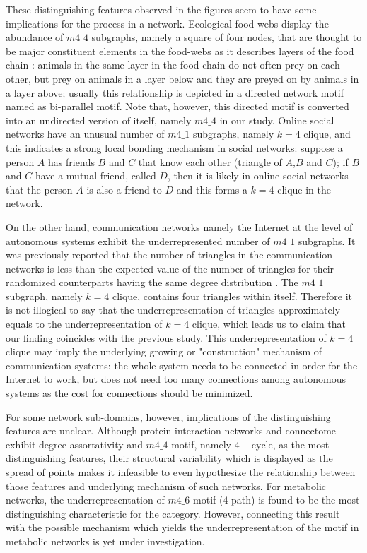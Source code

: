 These distinguishing features observed in the figures seem to have some implications for the process in a network. Ecological food-webs display the abundance of $m4\_4$ subgraphs, namely a square of four nodes, that are thought to be major constituent elements in the food-webs as it describes layers of the food chain \cite{Milo_motif,BiParallel}: animals in the same layer in the food chain do not often prey on each other, but prey on animals in a layer below and they are preyed on by animals in a layer above; usually this relationship is depicted in a directed network motif named as bi-parallel motif. Note that, however, this directed motif is converted into an undirected version of itself, namely $m4\_4$ in our study. Online social networks have an unusual number of $m4\_1$ subgraphs, namely $k = 4$ clique, and this indicates a strong local bonding mechanism in social networks: suppose a person $A$ has friends $B$ and $C$ that know each other (triangle of $A$,$B$ and $C$); if $B$ and $C$ have a mutual friend, called $D$, then it is likely in online social networks that the person $A$ is also a friend to $D$ and this forms a $k=4$ clique in the network.  

On the other hand, communication networks namely the Internet at the level of autonomous systems exhibit the underrepresented number of  $m4\_1$ subgraphs. It was previously reported that the number of triangles in the communication networks is less than the expected value of the number of triangles for their randomized counterparts having the same degree distribution \cite{InternetClustering}. The $m4\_1$ subgraph, namely $k=4$ clique, contains four triangles within itself. Therefore it is not illogical to say that the underrepresentation of triangles approximately equals to the underrepresentation of $k=4$ clique, which leads us to claim that our finding coincides with the previous study. This underrepresentation of $k=4$ clique may imply the underlying growing or "construction" mechanism of communication systems: the whole system needs to be connected in order for the Internet to work, but does not need too many connections among autonomous systems as the cost for connections should be minimized. 

For some network sub-domains, however, implications of the distinguishing features are unclear. Although protein interaction networks and connectome exhibit degree assortativity and $m4\_4$ motif, namely $4-$cycle, as the most distinguishing features, their structural variability which is displayed as the spread of points makes it infeasible to even hypothesize the relationship between those features and underlying mechanism of such networks. For metabolic networks, the underrepresentation of $m4\_6$ motif ($4$-path) is found to be the most distinguishing characteristic for the category. However, connecting this result with the possible mechanism which yields the underrepresentation of the motif in metabolic networks is yet under investigation.

